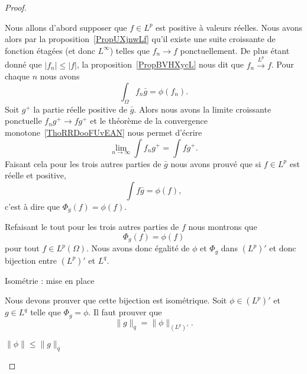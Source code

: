 \begin{proof}
\begin{subproof}
            Nous allons d'abord supposer que \( f\in L^p\) est positive à valeurs réelles. Nous avons alors par la proposition~\ref{PropUXjnwLf} qu'il existe une suite croissante de fonction étagées (et donc \( L^{\infty}\)) telles que \( f_n\to f\) ponctuellement. De plus étant donné que \( | f_n |\leq | f |\), la proposition~\ref{PropBVHXycL} nous dit que \( f_n\stackrel{L^p}{\longrightarrow}f\). Pour chaque \( n\) nous avons
            \begin{equation}
                \int_{\Omega}f_n\bar g=\phi(f_n).
            \end{equation}
            Soit \( g^+\) la partie réelle positive de \( \bar g\). Alors nous avons la limite croissante ponctuelle \( f_ng^+\to fg^+\) et le théorème de la convergence monotone~\ref{ThoRRDooFUvEAN} nous permet d'écrire
            \begin{equation}
                \lim_{n\to \infty} \int f_ng^+=\int fg^+.
            \end{equation}
            Faisant cela pour les trois autres parties de \( \bar g\) nous avons prouvé que si \( f\in L^p\) est réelle et positive,
            \begin{equation}
                \int f\bar g=\phi(f),
            \end{equation}
            c'est à dire que \( \Phi_g(f)=\phi(f)\).

            Refaisant le tout pour les trois autres parties de \( f\) nous montrons que
            \begin{equation}
                \Phi_g(f)=\phi(f)
            \end{equation}
            pour tout \( f\in L^p(\Omega)\). Nous avons donc égalité de \( \phi\) et \( \Phi_g\) dans \(  (L^p)' \) et donc bijection entre \( (L^p)'\) et \( L^q\).

        \item[Isométrie : mise en place]

            Nous devons prouver que cette bijection est isométrique. Soit \( \phi\in (L^p)'\) et \( g\in L^q\) telle que \( \Phi_g=\phi\). Il faut prouver que
            \begin{equation}
                \| g \|_q=\| \phi \|_{(L^p)'}.
            \end{equation}

        \item[ \( \| \phi \|\leq \| g \|_q\) ]


\end{subproof}
\end{proof}
